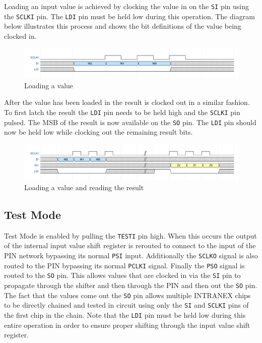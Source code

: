\documentclass{article}
\begin{document}
Loading an input value is achieved by clocking the value in on the \texttt{SI}
pin using the \texttt{SCLKI} pin. The \texttt{LDI} pin must be held low during
this operation. The diagram below illustrates this process and shows the bit
definitions of the value being clocked in.

\begin{figure}[H]
    \centering
    \includegraphics[width=\linewidth]{../waveforms/shift_load.png}
    \caption{Loading a value}
\end{figure}

After the value has been loaded in the result is clocked out in a similar
fashion. To first latch the result the \texttt{LDI} pin needs to be held high
and the \texttt{SCLKI} pin pulsed. The MSB of the result is now available on
the \texttt{SO} pin. The \texttt{LDI} pin should now be held low while clocking out
the remaining result bits.

\begin{figure}[H]
    \centering
    \includegraphics[width=\linewidth]{../waveforms/shift_load_read.png}
    \caption{Loading a value and reading the result}
\end{figure}

\subsection{Test Mode}

Test Mode is enabled by pulling the \texttt{TESTI} pin high. When this occurs
the output of the internal input value shift register is rerouted to connect to
the input of the PIN network bypassing its normal \texttt{PSI} input.
Additionally the \texttt{SCLKO} signal is also routed to the PIN bypassing its
normal \texttt{PCLKI} signal. Finally the \texttt{PSO} signal is routed to the
\texttt{SO} pin. This allows values that are clocked in via the \texttt{SI} pin
to propagate through the shifter and then through the PIN and then out the
\texttt{SO} pin. The fact that the values come out the \texttt{SO} pin allows
multiple INTRANEX chips to be directly chained and tested in circuit using only
the \texttt{SI} and \texttt{SCLKI} pins of the first chip in the chain. Note
that the \texttt{LDI} pin must be held low during this entire operation in
order to ensure proper shifting through the input value shift register.
\end{document}
